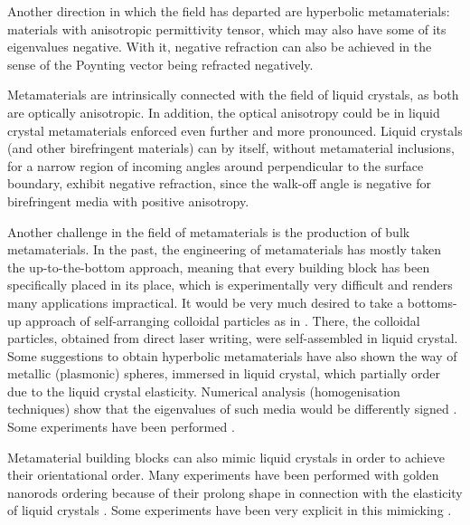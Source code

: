 \documentclass[a4paper,11pt]{article}
\begin{document}
Another direction in which the field has departed are hyperbolic metamaterials: materials with anisotropic permittivity tensor, which may also have some of its eigenvalues negative. 
With it, negative refraction can also be achieved in the sense of the Poynting vector being refracted negatively.



Metamaterials are intrinsically connected with the field of liquid crystals, as both are optically anisotropic. 
In addition, the optical anisotropy could be in liquid crystal metamaterials enforced even further and more pronounced. 
Liquid crystals (and other birefringent materials) can by itself, without metamaterial inclusions, for a narrow region of incoming angles around perpendicular to the surface boundary, exhibit negative refraction, since the walk-off angle is negative for birefringent media with positive anisotropy. 


Another challenge in the field of metamaterials is the production of bulk metamaterials. 
In the past, the engineering of metamaterials has mostly taken the up-to-the-bottom approach, meaning that every building block has been specifically placed in its place, which is experimentally very difficult and renders many applications impractical. 
It would be very much desired to take a bottoms-up approach of self-arranging colloidal particles as in \cite{tartan}. 
There, the colloidal particles, obtained from direct laser writing, were self-assembled in liquid crystal. 
Some suggestions to obtain hyperbolic metamaterials have also shown the way of metallic (plasmonic) spheres, immersed in liquid crystal, which partially order due to the liquid crystal elasticity. 
Numerical analysis (homogenisation techniques) show that the eigenvalues of such media would be differently signed \cite{khoo}. 
Some experiments have been performed \cite{ponsinet-virginie?}. 

Metamaterial building blocks can also mimic liquid crystals in order to achieve their orientational order. 
Many experiments have been performed with golden nanorods ordering because of their prolong shape in connection with the elasticity of liquid crystals \cite{nanoparticles}. 
Some experiments have been very explicit in this mimicking \cite{shadrivov}. 
\end{document}
